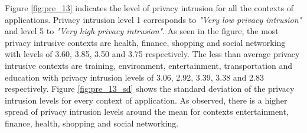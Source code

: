 Figure \ref{fig:pre_13} indicates the level of privacy intrusion for all the contexts of applications.  Privacy intrusion level 1 corresponds to \textit{"Very low privacy intrusion"} and level 5 to \textit{"Very high privacy intrusion"}. As seen in the figure, the most privacy intrusive contexts are health, finance, shopping and social networking with levels of 3.60, 3.85, 3.50 and 3.75 respectively. The less than average privacy intrusive contexts are training, environment, entertainment, transportation and education with privacy intrusion levels of 3.06, 2.92, 3.39, 3.38 and 2.83 respectively. Figure \ref{fig:pre_13_sd} shows the standard deviation of the privacy intrusion levels for every context of application. As observed, there is a higher spread of privacy intrusion levels around the mean for contexts entertainment, finance, health, shopping and social networking.
%
%
%
%
%
%
%
